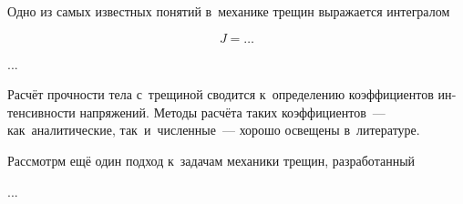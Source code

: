 






\begin{otherlanguage}{russian}

Одно из самых известных понятий в~механике трещин выражается интегралом

\nopagebreak\vspace{-0.2em}\begin{equation}
J = \ldots
\end{equation}

...



\end{otherlanguage}



\begin{otherlanguage}{russian}

Расчёт прочности тела с~трещиной сводится к~определению коэффициентов интенсивности напряжений. Методы расчёта таких коэффициентов~--- как~аналитические, так~и~численные~--- хорошо освещены в~литературе.

Рассмотрм ещё один подход к~задачам механики трещин, разработанный

...



\end{otherlanguage}


